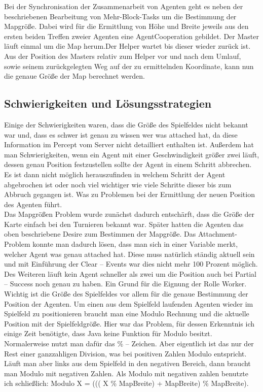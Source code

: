 \documentclass[runningheads]{llncs}
\begin{document}
Bei der Synchronisation der Zusammenarbeit von Agenten  geht es neben der beschriebenen Bearbeitung von Mehr-Block-Tasks um die Bestimmung der Mapgröße. Dabei wird für die Ermittlung von Höhe und Breite jeweils aus den ersten beiden Treffen zweier Agenten eine AgentCooperation gebildet. Der Master läuft einmal um die Map herum.Der Helper wartet bis dieser wieder zurück ist. Aus der Position des Masters relativ zum Helper vor und nach dem Umlauf, sowie seinem zurückgelegten Weg auf der zu ermittelnden Koordinate, kann nun die genaue Größe der Map berechnet werden. 

\subsection{Schwierigkeiten und Lösungsstrategien}
Einige der Schwierigkeiten waren, dass die Größe des Spielfeldes nicht bekannt war und, dass es schwer ist genau zu wissen wer was attached hat, da diese Information im Percept vom Server nicht detailliert enthalten ist. Außerdem hat man Schwierigkeiten, wenn ein Agent mit einer Geschwindigkeit größer zwei läuft, dessen genau Position festzustellen sollte der Agent in einem Schritt abbrechen. Es ist dann nicht möglich herauszufinden in welchem Schritt der Agent abgebrochen ist oder noch viel wichtiger wie viele Schritte dieser bis zum Abbruch gegangen ist. Was zu Problemen bei der Ermittlung der neuen Position des Agenten führt.\\

Das Mapgrößen Problem wurde zunächst dadurch entschärft, dass die Größe der Karte einfach bei den Turnieren bekannt war. Später hatten die Agenten das oben beschriebene Desire zum Bestimmen der Mapgröße.
Das Attachment-Problem konnte man dadurch lösen, dass man sich in einer Variable merkt, welcher Agent was genau attached hat. Diese muss natürlich ständig aktuell sein und mit Einführung der Clear – Events war dies nicht mehr 100 Prozent möglich. Des Weiteren läuft kein Agent schneller als zwei um die Position auch bei Partial – Success noch genau zu haben. Ein Grund für die Eignung der Rolle Worker.\\

Wichtig ist die Größe des Spielfeldes vor allem für die genaue Bestimmung der Position der Agenten. Um einen aus dem Spielfeld laufenden Agenten wieder im Spielfeld zu positionieren braucht man eine Modulo Rechnung und die aktuelle Position mit der Spielfeldgröße. Hier war das Problem, für dessen Erkenntnis ich einige Zeit benötigte, dass Java keine Funktion für Modulo besitzt. Normalerweise nutzt man dafür das \% – Zeichen. Aber eigentlich ist das nur der Rest einer ganzzahligen Division, was bei positiven Zahlen Modulo entspricht. Läuft man aber links aus dem Spielfeld in den negativen Bereich, dann braucht man Modulo mit negativen Zahlen.  Als Modulo mit negativen zahlen benutzte ich schließlich: 
Modulo X = ((( X \% MapBreite) + MapBreite) \% MapBreite). 
\end{document}
